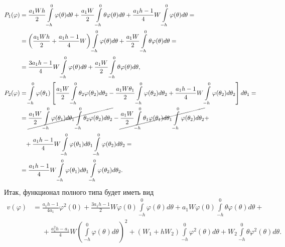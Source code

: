 \documentclass[a4paper,14pt]{article}
\begin{document}
\begin{equation*}
  \begin{aligned}
    P_1(\varphi)
    &=
      \frac{a_1 W h}{2}
      \int\limits_{-h}^{0} \varphi(\theta) d\theta
      +
      \frac{a_1 W}{2}
      \int\limits_{-h}^{0} \theta \varphi(\theta) d\theta
      +
      \frac{a_1 h - 1}{4} W
      \int\limits_{-h}^{0} \varphi(\theta) d\theta = \\
    &=
      \left(
      \frac{a_1 W h}{2}
      +
      \frac{a_1 h - 1}{4} W
      \right)
      \int\limits_{-h}^{0} \varphi(\theta) d\theta
      +
      \frac{a_1 W}{2}
      \int\limits_{-h}^{0} \theta \varphi(\theta) d\theta = \\
    &=
      \frac{3 a_1 h - 1}{4}
      W
      \int\limits_{-h}^{0} \varphi(\theta) d\theta
      +
      \frac{a_1 W}{2}
      \int\limits_{-h}^{0} \theta \varphi(\theta) d\theta, \\
    P_2(\varphi)
    &=
      \int\limits_{-h}^{0} \varphi(\theta_1) \left[
      \frac{a_1 W}{2}
      \int\limits_{-h}^{0} \theta_2 \varphi(\theta_2) d\theta_2
      - \frac{a_1 W \theta_1}{2}
      \int\limits_{-h}^{0} \varphi(\theta_2) d\theta_2
      + \frac{a_1 h - 1}{4} W
      \int\limits_{-h}^{0} \varphi(\theta_2) d\theta_2
      \right] d\theta_1 = \\
    &=
      \cancel{
      \frac{a_1 W}{2}
      \int\limits_{-h}^{0} \varphi(\theta_1) d\theta_1
      \int\limits_{-h}^{0} \theta_2 \varphi(\theta_2) d\theta_2
      }
      -
      \cancel{
      \frac{a_1 W}{2}
      \int\limits_{-h}^{0} \theta_1 \varphi(\theta_1) d\theta_1
      \int\limits_{-h}^{0} \varphi(\theta_2) d\theta_2
      } + \\
    &\phantom{=}
      + \frac{a_1 h - 1}{4} W
      \int\limits_{-h}^{0} \varphi(\theta_1) d\theta_1
      \int\limits_{-h}^{0} \varphi(\theta_2) d\theta_2 = \\
    &=
      \frac{a_1 h - 1}{4} W
      \int\limits_{-h}^{0} \varphi(\theta_1) d\theta_1
      \int\limits_{-h}^{0} \varphi(\theta_2) d\theta_2.
  \end{aligned}
\end{equation*}
Итак, функционал полного типа будет иметь вид
\begin{equation*}
  \begin{aligned}
    v(\varphi)
    &=
      \frac{a_1 h - 1}{4 a_1} \varphi^2(0)
      +
      \frac{3 a_1 h - 1}{2}
      W
      \varphi(0)
      \int\limits_{-h}^{0} \varphi(\theta) d\theta
      +
      a_1 W \varphi(0)
      \int\limits_{-h}^{0} \theta \varphi(\theta) d\theta + \\
    &\phantom{=}
      +
      \frac{a_1^2 h - a_1}{4} W
      {\left(
      \int\limits_{-h}^{0} \varphi(\theta) d\theta
      \right)}^2
      +
      \left( W_1 + h W_2 \right)
      \int\limits_{-h}^{0} \varphi^2(\theta) d\theta
      +
      W_2
      \int\limits_{-h}^{0} \theta \varphi^2(\theta) d\theta.
  \end{aligned}
\end{equation*}
\end{document}
